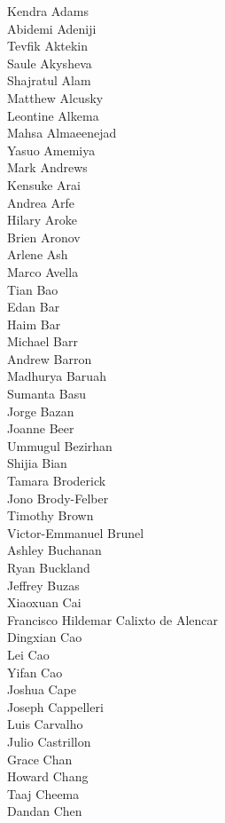 Kendra Adams\\
Abidemi Adeniji\\
Tevfik Aktekin\\
Saule Akysheva\\
Shajratul Alam\\
Matthew Alcusky\\
Leontine Alkema\\
Mahsa Almaeenejad\\
Yasuo Amemiya\\
Mark Andrews\\
Kensuke Arai\\
Andrea Arfe\\
Hilary Aroke\\
Brien Aronov\\
Arlene Ash\\
Marco Avella\\
Tian Bao\\
Edan Bar\\
Haim Bar\\
Michael Barr\\
Andrew Barron\\
Madhurya Baruah\\
Sumanta Basu\\
Jorge Bazan\\
Joanne Beer\\
Ummugul Bezirhan\\
Shijia Bian\\
Tamara Broderick\\
Jono Brody-Felber\\
Timothy Brown\\
Victor-Emmanuel Brunel\\
Ashley Buchanan\\
Ryan Buckland\\
Jeffrey Buzas\\
Xiaoxuan Cai\\
Francisco Hildemar Calixto de Alencar\\
Dingxian Cao\\
Lei Cao\\
Yifan Cao\\
Joshua Cape\\
Joseph Cappelleri\\
Luis Carvalho\\
Julio Castrillon\\
Grace Chan\\
Howard Chang\\
Taaj Cheema\\
Dandan Chen\\
